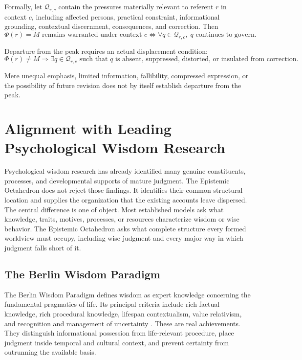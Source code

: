 \documentclass[11pt]{article}
\begin{document}
Formally, let $\mathcal Q_{r,c}$ contain the pressures materially relevant to referent $r$ in context $c$, including affected persons, practical constraint, informational grounding, contextual discernment, consequences, and correction. Then
\[
\boxed{
\Phi(r)=M
\text{ remains warranted under context }c
\iff
\forall q\in\mathcal Q_{r,c},
\;q\text{ continues to govern}.
}
\]

Departure from the peak requires an actual displacement condition:
\[
\Phi(r)\neq M
\Longrightarrow
\exists q\in\mathcal Q_{r,c}
\text{ such that }q
\text{ is absent, suppressed, distorted, or insulated from correction}.
\]

Mere unequal emphasis, limited information, fallibility, compressed expression, or the possibility of future revision does not by itself establish departure from the peak.

\section{Alignment with Leading Psychological Wisdom Research}

Psychological wisdom research has already identified many genuine constituents, processes, and developmental supports of mature judgment. The Epistemic Octahedron does not reject those findings. It identifies their common structural location and supplies the organization that the existing accounts leave dispersed. The central difference is one of object. Most established models ask what knowledge, traits, motives, processes, or resources characterize wisdom or wise behavior. The Epistemic Octahedron asks what complete structure every formed worldview must occupy, including wise judgment and every major way in which judgment falls short of it.

\subsection{The Berlin Wisdom Paradigm}

The Berlin Wisdom Paradigm defines wisdom as expert knowledge concerning the fundamental pragmatics of life. Its principal criteria include rich factual knowledge, rich procedural knowledge, lifespan contextualism, value relativism, and recognition and management of uncertainty \cite{baltes2000}. These are real achievements. They distinguish informational possession from life-relevant procedure, place judgment inside temporal and cultural context, and prevent certainty from outrunning the available basis.
\end{document}
